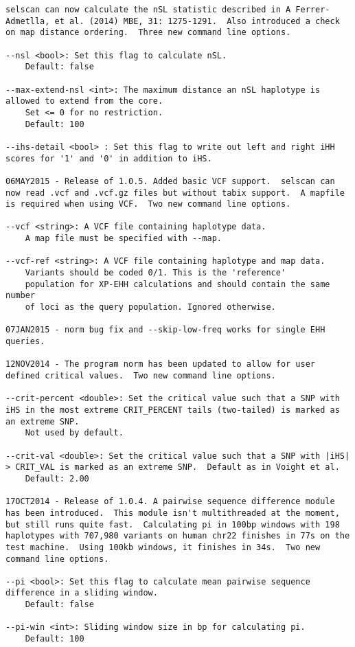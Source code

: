 \documentclass[12pt]{article}%
\begin{document}
\begin{lstlisting}
selscan can now calculate the nSL statistic described in A Ferrer-Admetlla, et al. (2014) MBE, 31: 1275-1291.  Also introduced a check on map distance ordering.  Three new command line options.

--nsl <bool>: Set this flag to calculate nSL.
	Default: false

--max-extend-nsl <int>: The maximum distance an nSL haplotype is allowed to extend from the core.
	Set <= 0 for no restriction.
	Default: 100

--ihs-detail <bool> : Set this flag to write out left and right iHH scores for '1' and '0' in addition to iHS.

06MAY2015 - Release of 1.0.5. Added basic VCF support.  selscan can now read .vcf and .vcf.gz files but without tabix support.  A mapfile is required when using VCF.  Two new command line options.

--vcf <string>: A VCF file containing haplotype data.
	A map file must be specified with --map.

--vcf-ref <string>: A VCF file containing haplotype and map data.
	Variants should be coded 0/1. This is the 'reference'
	population for XP-EHH calculations and should contain the same number
	of loci as the query population. Ignored otherwise.

07JAN2015 - norm bug fix and --skip-low-freq works for single EHH queries.

12NOV2014 - The program norm has been updated to allow for user defined critical values.  Two new command line options.

--crit-percent <double>: Set the critical value such that a SNP with iHS in the most extreme CRIT_PERCENT tails (two-tailed) is marked as an extreme SNP.
	Not used by default.

--crit-val <double>: Set the critical value such that a SNP with |iHS| > CRIT_VAL is marked as an extreme SNP.  Default as in Voight et al.
	Default: 2.00

17OCT2014 - Release of 1.0.4. A pairwise sequence difference module has been introduced.  This module isn't multithreaded at the moment, but still runs quite fast.  Calculating pi in 100bp windows with 198 haplotypes with 707,980 variants on human chr22 finishes in 77s on the test machine.  Using 100kb windows, it finishes in 34s.  Two new command line options.

--pi <bool>: Set this flag to calculate mean pairwise sequence difference in a sliding window.
	Default: false

--pi-win <int>: Sliding window size in bp for calculating pi.
	Default: 100


\end{lstlisting}
\end{document}
